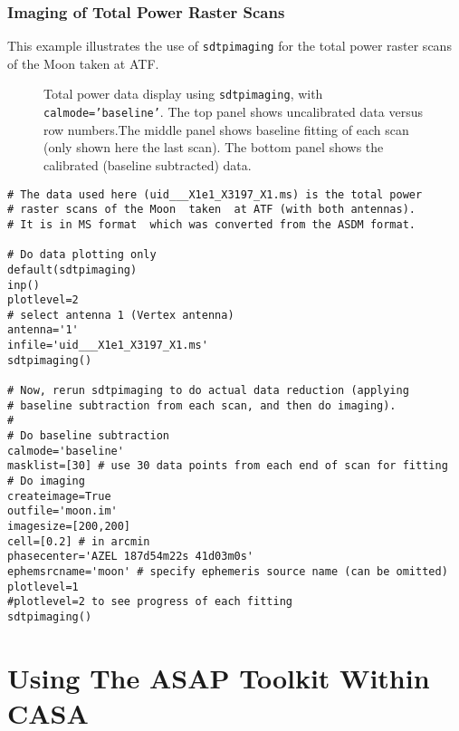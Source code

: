 \subsubsection{Imaging of Total Power Raster Scans}
This example illustrates the use of {\tt sdtpimaging} for the total
power raster scans of the Moon taken at ATF.
\begin{figure}[h!]
\begin{center}
\caption{\label{fig:sdtpimaging} Total power data display using {\tt sdtpimaging}, 
with {\tt calmode='baseline'}. The top  panel shows uncalibrated data versus row numbers.The middle panel shows baseline fitting of each scan (only shown here the last
scan). The bottom panel shows the calibrated (baseline subtracted) data. }
\hrulefill
\end{center}
\end{figure}

\begin{verbatim}
# The data used here (uid___X1e1_X3197_X1.ms) is the total power 
# raster scans of the Moon  taken  at ATF (with both antennas). 
# It is in MS format  which was converted from the ASDM format.

# Do data plotting only
default(sdtpimaging)
inp()
plotlevel=2
# select antenna 1 (Vertex antenna) 
antenna='1'
infile='uid___X1e1_X3197_X1.ms'
sdtpimaging()

# Now, rerun sdtpimaging to do actual data reduction (applying
# baseline subtraction from each scan, and then do imaging).
#
# Do baseline subtraction 
calmode='baseline'
masklist=[30] # use 30 data points from each end of scan for fitting
# Do imaging 
createimage=True
outfile='moon.im'
imagesize=[200,200]
cell=[0.2] # in arcmin
phasecenter='AZEL 187d54m22s 41d03m0s'  
ephemsrcname='moon' # specify ephemeris source name (can be omitted)
plotlevel=1
#plotlevel=2 to see progress of each fitting
sdtpimaging()
\end{verbatim}



\section{Using The ASAP Toolkit Within CASA}
\label{section:sd.asap}

